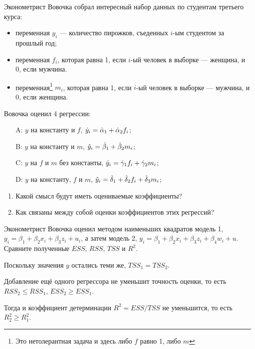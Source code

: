 \begin{problem}

Эконометрист Вовочка собрал интересный набор данных по студентам третьего курса:
\begin{itemize}
\item переменная $y_i$ — количество пирожков, съеденных $i$-ым студентом за прошлый год;
\item переменная $f_i$, которая равна 1, если $i$-ый человек в выборке — женщина, и 0, если мужчина.
\item переменная\footnote{Это нетолерантная задача и здесь либо $f$ равно 1, либо $m$} $m_i$, которая равна 1, если $i$-ый человек в выборке — мужчина, и 0, если женщина.
\end{itemize}

Вовочка оценил 4 регрессии:
\begin{enumerate}
\item[A:] $y$ на константу и $f$, $\hat{y}_i = \hat \alpha_1 + \hat \alpha_2 f_i$;
\item[B:] $y$ на константу и $m$, $\hat{y}_i = \hat{\beta}_1 + \hat{\beta}_2 m_i$;
\item[C:] $y$ на $f$ и $m$ без константы, $\hat{y}_i = \hat \gamma_1 f_i + \hat \gamma_2 m_i$;
\item[D:] $y$ на константу, $f$ и $m$, $\hat{y}_i = \hat \delta_1 + \hat \delta_2 f_i + \hat \delta_3 m_i$;
\end{enumerate}

\begin{enumerate}
\item Какой смысл будут иметь оцениваемые коэффициенты?
\item Как связаны между собой оценки коэффициентов этих регрессий?
\end{enumerate}


\begin{sol}
\end{sol}
\end{problem}


\begin{problem}
Эконометрист Вовочка оценил методом наименьших квадратов модель 1, $y_i=\beta_1+\beta_2 x_i+\beta_3 z_i+u_i$,
а затем модель 2, $y_i=\beta_1+\beta_2 x_i+\beta_3 z_i+\beta_4 w_i+u$.
Сравните полученные $ESS$, $RSS$, $TSS$ и $R^2$.

\begin{sol}
Поскольку значения $y$ остались теми же, $TSS_1 = TSS_2$.

Добавление ещё одного регрессора не уменьшит точность оценки, то есть
$RSS_2 \leq RSS_1$, $ESS_2 \geq ESS_1$.

Тогда и коэффициент детерминации $R^2 = ESS / TSS$ не уменьшится, то есть
$R^2_2 \geq R^2_1$.
\end{sol}
\end{problem}

